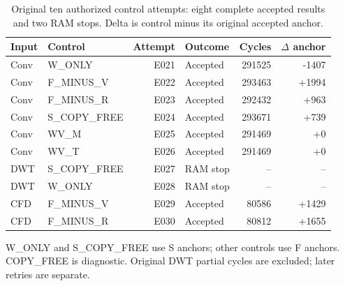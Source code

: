 \begin{table}[t]
\centering
\caption{Original ten authorized control attempts: eight complete accepted results and two RAM stops. Delta is control minus its original accepted anchor.}
\label{tab:ten-controls}
\begin{tabular}{llrlrr}
\hline
Input & Control & Attempt & Outcome & Cycles & $\Delta$ anchor \\
\hline
Conv & W\_ONLY & E021 & Accepted & 291525 & -1407 \\
Conv & F\_MINUS\_V & E022 & Accepted & 293463 & +1994 \\
Conv & F\_MINUS\_R & E023 & Accepted & 292432 & +963 \\
Conv & S\_COPY\_FREE & E024 & Accepted & 293671 & +739 \\
Conv & WV\_M & E025 & Accepted & 291469 & +0 \\
Conv & WV\_T & E026 & Accepted & 291469 & +0 \\
DWT & S\_COPY\_FREE & E027 & RAM stop & -- & -- \\
DWT & W\_ONLY & E028 & RAM stop & -- & -- \\
CFD & F\_MINUS\_V & E029 & Accepted & 80586 & +1429 \\
CFD & F\_MINUS\_R & E030 & Accepted & 80812 & +1655 \\
\hline
\end{tabular}
{\footnotesize W\_ONLY and S\_COPY\_FREE use S anchors; other controls use F anchors. COPY\_FREE is diagnostic. Original DWT partial cycles are excluded; later retries are separate.}
\end{table}
